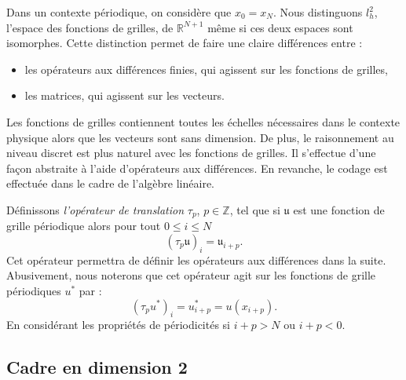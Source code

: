 Dans un contexte périodique, on considère que $x_0 = x_N$.
Nous distinguons $l^2_h$, l'espace des fonctions de grilles, de $\mathbb{R}^{N+1}$ même si ces deux espaces sont isomorphes. Cette distinction permet de faire une claire différences entre :
\begin{itemize}
\item les opérateurs aux différences finies, qui agissent sur les fonctions de grilles,
\item les matrices, qui agissent sur les vecteurs.
\end{itemize}
Les fonctions de grilles contiennent toutes les échelles nécessaires dans le contexte physique alors que les vecteurs sont sans dimension. De plus, le raisonnement au niveau discret est plus naturel avec les fonctions de grilles. Il s'effectue d'une façon abstraite à l'aide d'opérateurs aux différences. En revanche, le codage est effectuée dans le cadre de l'algèbre linéaire.

Définissons \textit{l'opérateur de translation} $\tau_p$, $p \in \mathbb{Z}$, tel que si $\mathfrak{u}$ est une fonction de grille périodique alors pour tout $0 \leq i \leq N$
\begin{equation}
(\tau_p \mathfrak{u})_i = \mathfrak{u}_{i+p}.
\end{equation}
Cet opérateur permettra de définir les opérateurs aux différences dans la suite. Abusivement, nous noterons que cet opérateur agit sur les fonctions de grille périodiques $u^*$ par :
\begin{equation}
(\tau_p u^*)_i = u^*_{i+p} = u(x_{i+p}).
\end{equation}
En considérant les propriétés de périodicités si $i+p > N$ ou $i+p<0$.









\subsection{Cadre en dimension 2}
\label{sec:notation_2D}

